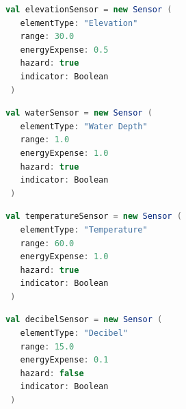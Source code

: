 \begin{lstlisting}[language=Scala]
 val elevationSensor = new Sensor (
   elementType: "Elevation"
   range: 30.0
   energyExpense: 0.5
   hazard: true
   indicator: Boolean
 )
\end{lstlisting}

\begin{lstlisting}[language=Scala]
 val waterSensor = new Sensor (
   elementType: "Water Depth"
   range: 1.0
   energyExpense: 1.0
   hazard: true
   indicator: Boolean
 )
\end{lstlisting}

\begin{lstlisting}[language=Scala]
 val temperatureSensor = new Sensor (
   elementType: "Temperature"
   range: 60.0
   energyExpense: 1.0
   hazard: true
   indicator: Boolean
 )
\end{lstlisting}

\begin{lstlisting}[language=Scala]
 val decibelSensor = new Sensor (
   elementType: "Decibel"
   range: 15.0
   energyExpense: 0.1
   hazard: false
   indicator: Boolean
 )
\end{lstlisting}
